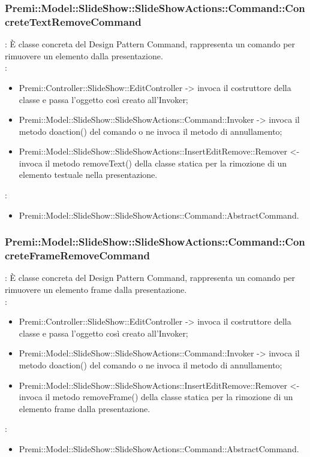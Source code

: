 {     \subsubsection{Premi::Model::SlideShow::SlideShowActions::Command::ConcreteTextRemoveCommand}{
				\textbf{\tipo}: È classe concreta del Design Pattern Command, rappresenta un comando per rimuovere un elemento dalla presentazione.\\	
				\textbf{\relaz}: 
				\begin{itemize}
					\item Premi::Controller::SlideShow::EditController -> invoca il costruttore della classe e passa l’oggetto così creato all’Invoker;
					\item Premi::Model::SlideShow::SlideShowActions::Command::Invoker -> invoca il metodo doaction() del comando o ne invoca il metodo di annullamento;
                    \item Premi::Model::SlideShow::SlideShowActions::InsertEditRemove::Remover <- invoca il metodo removeText() della classe statica per la rimozione di un elemento testuale nella presentazione.
				\end{itemize}	
                \textbf{\base}: 
                    \begin{itemize}
                    \item Premi::Model::SlideShow::SlideShowActions::Command::AbstractCommand.
                    \end{itemize}
                    }
        \subsubsection{Premi::Model::SlideShow::SlideShowActions::Command::ConcreteFrameRemoveCommand}{
				\textbf{\tipo}: È classe concreta del Design Pattern Command, rappresenta un comando per rimuovere un elemento frame dalla presentazione.\\	
				\textbf{\relaz}: 
				\begin{itemize}
					\item Premi::Controller::SlideShow::EditController -> invoca il costruttore della classe e passa l’oggetto così creato all’Invoker;
					\item Premi::Model::SlideShow::SlideShowActions::Command::Invoker -> invoca il metodo doaction() del comando o ne invoca il metodo di annullamento;
                    \item Premi::Model::SlideShow::SlideShowActions::InsertEditRemove::Remover <- invoca il metodo removeFrame() della classe statica per la rimozione di un elemento frame dalla presentazione.
				\end{itemize}	
                \textbf{\base}: 
                    \begin{itemize}
                    \item Premi::Model::SlideShow::SlideShowActions::Command::AbstractCommand.
                    \end{itemize}
                    }                   
}
